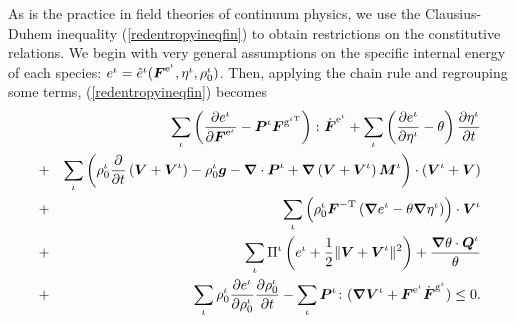 As is the practice in field theories of continuum physics, we use
the Clausius-Duhem inequality (\ref{redentropyineqfin}) to obtain
restrictions on the constitutive relations. We begin with very
general assumptions on the specific internal energy of each
species: $ e^\iota = \hat{e}^\iota(\mbox{\boldmath$ F$}^{\mathrm{e}^\iota},
\eta^\iota, \rho_0^\iota)$. Then, applying the chain rule and
regrouping some terms, (\ref{redentropyineqfin}) becomes
\begin{eqnarray}
& &\sum\limits_{\iota}\left(\frac{\partial
e^\iota}{\partial\mbox{\boldmath$ F$}^{\mathrm{e}^\iota}} -
  \mbox{\boldmath$ P$}^\iota\mbox{\boldmath$ F$}^{\mathrm{g}^{\iota\mathrm{T}}}\right)
  \colon\dot{\mbox{\boldmath$ F$}}^{\mathrm{e}^\iota} 
+ \sum\limits_{\iota}\left(\frac{\partial e^\iota}{\partial
\eta^\iota}-\theta\right)\frac{\partial\eta^\iota}{\partial t}\nonumber\\
&+&\sum\limits_{\iota} \left(\rho^\iota_0\frac{\partial}{\partial
t}\left(\mbox{\boldmath$ V$}+\mbox{\boldmath$ V$}^\iota\right) - \rho_0^\iota\mbox{\boldmath$ g$} -
\mbox{\boldmath$\nabla$}\cdot\mbox{\boldmath$ P$}^\iota +
\mbox{\boldmath$\nabla$}\left(\mbox{\boldmath$ V$}+\mbox{\boldmath$ V$}^\iota\right)\mbox{\boldmath$ M$}^\iota\right)\cdot(\mbox{\boldmath$ V$}^\iota+\mbox{\boldmath$ V$})\nonumber\\
&+&\sum\limits_{\iota}\left(\rho^\iota_0\mbox{\boldmath$ F$}^{-\mathrm{T}}\left(\mbox{\boldmath$\nabla$}
e^\iota -
\theta\mbox{\boldmath$\nabla$}\eta^\iota\right)\right)\cdot\mbox{\boldmath$ V$}^\iota\nonumber\\
&+&\sum\limits_{\iota}\Pi^\iota\left(e^\iota +
\frac{1}{2}\Vert\mbox{\boldmath$ V$}+\mbox{\boldmath$ V$}^\iota\Vert^2\right) +
\frac{\mbox{\boldmath$\nabla$}\theta\cdot\mbox{\boldmath$ Q$}^\iota}{\theta}\nonumber\\
&+& \sum\limits_{\iota}\rho^\iota_0\frac{\partial
e^\iota}{\partial\rho^\iota_0}\frac{\partial
\rho^\iota_0}{\partial t} -
\sum\limits_{\iota}\mbox{\boldmath$ P$}^\iota\colon(\mbox{\boldmath$\nabla$}\mbox{\boldmath$ V$}^\iota +
\mbox{\boldmath$ F$}^{\mathrm{e}^\iota}\dot{\mbox{\boldmath$ F$}}^{\mathrm{g}^\iota}) \leq 0.
\label{redentropyineq1}
\end{eqnarray}

